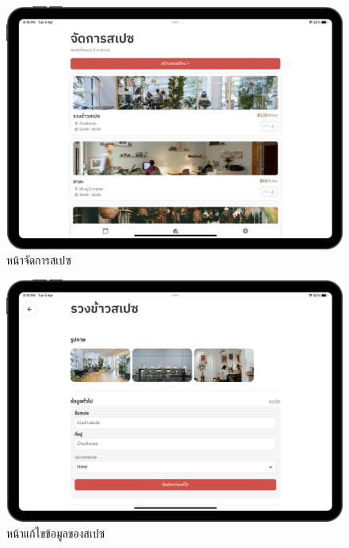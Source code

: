 \begin{figure}[ht]
    \begin{center}
    \includegraphics[width=5.5in]{./image/Flowider_space_mgmt.png}
    \end{center}
    \caption[Flowider space management]{หน้าจัดการสเปซ}
    \label{fig:Flowider_space_mgmt}
\end{figure}
\begin{figure}[ht]
    \begin{center}
    \includegraphics[width=5.5in]{./image/Flowider_space_edit_1.png}
    \end{center}
    \caption[Flowider space edit 1]{หน้าแก้ไขข้อมูลของสเปซ}
    \label{fig:Flowider_space_edit_1}
\end{figure}
